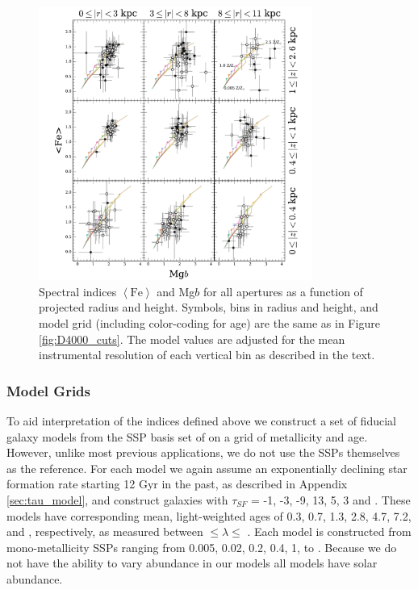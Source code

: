 \begin{figure}[t]
  \centering
  \includegraphics[width=0.8\textwidth]{891_1/figs/Mgb_multires.pdf}
  \caption{\label{fig:Mgb_cuts} Spectral indices
    $\left<\mathrm{Fe}\right>$ and Mg$b$ for all apertures as a
    function of projected radius and height. Symbols, bins in radius
    and height, and model grid (including color-coding for age) are
    the same as in Figure \ref{fig:D4000_cuts}. The model values are
    adjusted for the mean instrumental resolution of each vertical bin
    as described in the text.}
\end{figure}



\subsubsection{Model Grids}
\label{sec:fidgrid}

To aid interpretation of the indices defined above we construct a set
of fiducial galaxy models from the SSP basis set of \citet{Bruzual03}
on a grid of metallicity and age. However, unlike most previous
applications, we do not use the SSPs themselves as the reference. For
each model we again assume an exponentially declining star formation
rate starting 12 Gyr in the past, as described in Appendix
\ref{sec:tau_model}, and construct galaxies with $\tau_{SF}$ = -1, -3,
-9, 13, 5, 3 and . These models have corresponding mean,
light-weighted ages of 0.3, 0.7, 1.3, 2.8, 4.7, 7.2, and
, respectively, as measured between 
$\leq\lambda\leq$ . Each model is constructed from
mono-metallicity SSPs ranging from 0.005, 0.02, 0.2, 0.4, 1, to
. Because we do not have the ability to vary abundance
in our models \citep[as done, for example, by][]{Trager08} all models
have solar abundance. 

